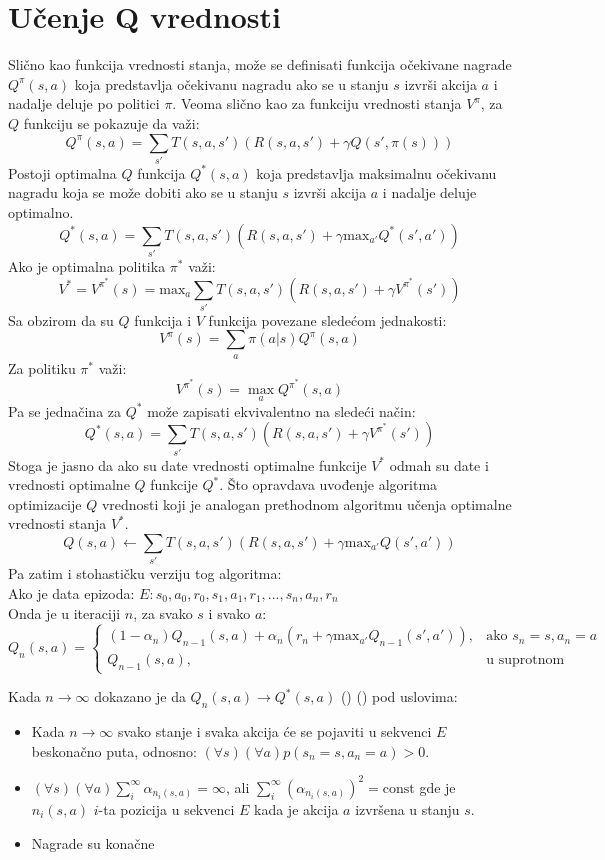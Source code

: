 \documentclass[a4paper,fleqn,12pt]{JMThesis}
\newcommand{\latin}{\fontencoding{T1}\selectfont\selectlanguage{english}}
\theoremstyle{plain}
\theoremstyle{definition}
\newcommand{\piopt}{{\pi}^{*}}
\theoremstyle{definition}
\begin{document}
\section{Učenje Q vrednosti}
Slično kao funkcija vrednosti stanja, može se definisati funkcija očekivane nagrade $Q^{\pi}(s,a)$ koja predstavlja očekivanu
nagradu ako se u stanju $s$ izvrši akcija $a$ i nadalje deluje po politici $\pi$. Veoma slično kao za funkciju vrednosti
stanja $V^{\pi}$, za $Q$ funkciju se pokazuje da važi:
\[
	Q^{\pi}(s,a) = \sum_{s'} T(s,a,s')(R(s,a,s') + \gamma Q(s',\pi(s)))
\]
Postoji optimalna $Q$ funkcija $Q^*(s,a)$ koja predstavlja maksimalnu očekivanu nagradu koja se može dobiti ako se u stanju
$s$ izvrši akcija $a$ i nadalje deluje optimalno.
\[
	Q^*(s,a) = \sum_{s'} T(s,a,s')(R(s,a,s') + \gamma \text{max}_{a'}Q^*(s',a'))
\]
Ako je optimalna politika $\piopt$ važi:
\[
	V^* = V^{\piopt}(s) = \text{max}_a \sum_{s'} T(s,a,s')(R(s,a,s') + \gamma V^{\piopt}(s'))
\]
Sa obzirom da su $Q$ funkcija i $V$ funkcija povezane sledećom jednakosti:
\[ V^{\pi}(s) = \sum_a \pi(a | s)Q^{\pi}(s,a) \]
Za politiku $\piopt$ važi:
\[ V^{\piopt}(s) = \max_a Q^{\piopt}(s,a) \]
Pa se jednačina za $Q^*$ može zapisati ekvivalentno na sledeći način:
\[
	Q^*(s,a) = \sum_{s'} T(s,a,s')(R(s,a,s') + \gamma V^{\piopt}(s'))
\]
Stoga je jasno da ako su date vrednosti optimalne funkcije $V^*$ odmah su date i vrednosti optimalne $Q$ funkcije $Q^*$.
Što opravdava uvođenje algoritma optimizacije $Q$ vrednosti koji je analogan prethodnom algoritmu učenja optimalne vrednosti stanja $V^*$.
\[ Q(s,a) \leftarrow \sum_{s'}T(s,a,s')(R(s,a,s')+\gamma \text{max}_{a'}Q(s',a')) \]
Pa zatim i stohastičku verziju tog algoritma:\\
Ako je data epizoda: $E: s_0,a_0,r_0,s_1,a_1,r_1,...,s_n,a_n,r_n$\\
Onda je u iteraciji $n$, za svako $s$ i svako $a$:\\
\[ 
	Q_n(s,a) =
	\begin{cases}
		(1-\alpha_n)Q_{n-1}(s,a) + \alpha_n (r_n + \gamma \text{max}_{a'}Q_{n-1}(s',a')), & \text{ako } s_n = s, a_n = a\\
		Q_{n-1}(s,a), & \text{u suprotnom}
	\end{cases}
\]

Kada $n \to \infty$ dokazano je da $Q_n(s,a) \to Q^*(s,a)$ {\latin (\cite{watkins1992q}) (\cite{sutton2018reinforcement})} pod uslovima:
\begin{itemize}
	\item Kada $n \to \infty$ svako stanje i svaka akcija će se pojaviti u sekvenci $E$ beskonačno puta, odnosno: $(\forall s)(\forall a)p(s_n = s, a_n = a) > 0$.
 	\item $(\forall s)(\forall a)  \sum_i^{\infty}\alpha_{n_i(s,a)} = \infty$, ali $\sum_i^{\infty}\left(\alpha_{ {n_i(s,a)}}\right)^2 = \text{const}$ gde je $n_i(s,a)$ $i$-ta pozicija u sekvenci $E$ kada je akcija $a$ izvršena u stanju $s$.
  	\item Nagrade su konačne 
\end{itemize}
\end{document}
